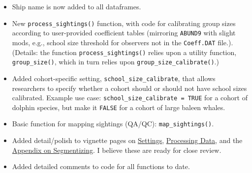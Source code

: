 \documentclass[
]{book}
\begin{document}
\begin{itemize}
\item
  Ship name is now added to all dataframes.
\item
  New \texttt{process\_sightings()} function, with code for calibrating group sizes according to user-provided coefficient tables (mirroring \texttt{ABUND9} with slight mods, e.g., school size threshold for observers not in the \texttt{Coeff.DAT} file.). (Details: the function \texttt{process\_sightings()} relies upon a utility function, \texttt{group\_size()}, which in turn relies upon \texttt{group\_size\_calibrate()}.)
\item
  Added cohort-specific setting, \texttt{school\_size\_calibrate}, that allows researchers to specify whether a cohort should or should not have school sizes calibrated. Example use case: \texttt{school\_size\_calibrate\ =\ TRUE} for a cohort of dolphin species, but make it \texttt{FALSE} for a cohort of large baleen whales.
\item
  Basic function for mapping sightings (QA/QC): \texttt{map\_sightings()}.
\item
  Added detail/polish to vignette pages on \protect\hyperlink{settings}{Settings}, \protect\hyperlink{processing}{Processing Data}, and the \protect\hyperlink{segmentizing}{Appendix on Segmentizing}. I believe these are ready for close review.
\item
  Added detailed comments to code for all functions to date.
\end{itemize}

  
\end{document}
